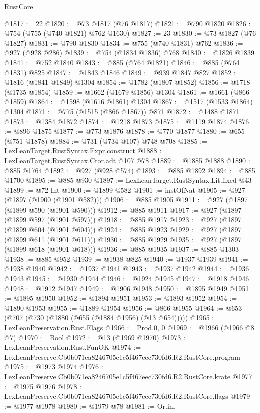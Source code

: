 \begin{lexlean}{RustCore}
\begin{coremodule}
@1817 := 22
@1820 := @73 @1817 (@76 @1817)
@1821 := @790 @1820
@1826 := @754 (@755 (@740 @1821) @762 @1630)
@1827 := 23
@1830 := @73 @1827 (@76 @1827)
@1831 := @790 @1830
@1834 := @755 (@740 @1831) @762
@1836 := @927 (@928 @286)
@1839 := @754 (@1834 @1836) @768
@1840 := @1826 @1839
@1841 := @752 @1840
@1843 := @885 (@764 @1821)
@1846 := @885 (@764 @1831) @825
@1847 := @1843 @1846
@1849 := @939 @1847 @827
@1852 := @1816 (@1841 @1849) @1304
@1854 := @1782 (@1807 @1852)
@1856 := @1718 (@1735 @1854)
@1859 := @1662 (@1679 @1856) @1304
@1861 := @1661 (@866 @1859)
@1864 := @1598 (@1616 @1861) @1304
@1867 := @1517 (@1533 @1864) @1304
@1871 := @775 (@1515 (@866 @1867)) @871
@1872 := @1488 @1871
@1873 := @1384 @1872
@1874 := @1218 @1873
@1875 := @1119 @1874
@1876 := @896 @1875
@1877 := @773 @1876
@1878 := @770 @1877
@1880 := @655 (@751 @1878)
@1884 := @731 (@734 @107) @748 @708
@1885 := LexLeanTarget.RustSyntax.Expr.construct
@1888 := LexLeanTarget.RustSyntax.Ctor.adt @107 @78
@1889 := @1885 @1888
@1890 := @885 @1764
@1892 := @927 (@928 @574)
@1893 := @885 @1892
@1894 := @885 @1700
@1895 := @885 @930
@1897 := LexLeanTarget.RustSyntax.Lit.fixed @43
@1899 := @72 Int
@1900 := @1899 @582
@1901 := instOfNat
@1905 := @927 (@1897 (@1900 (@1901 @582)))
@1906 := @885 @1905
@1911 := @927 (@1897 (@1899 @590 (@1901 @590)))
@1912 := @885 @1911
@1917 := @927 (@1897 (@1899 @597 (@1901 @597)))
@1918 := @885 @1917
@1923 := @927 (@1897 (@1899 @604 (@1901 @604)))
@1924 := @885 @1923
@1929 := @927 (@1897 (@1899 @611 (@1901 @611)))
@1930 := @885 @1929
@1935 := @927 (@1897 (@1899 @618 (@1901 @618)))
@1936 := @885 @1935
@1937 := @885 @1303
@1938 := @885 @952
@1939 := @1938 @825
@1940 := @1937 @1939
@1941 := @1938 @1940
@1942 := @1937 @1941
@1943 := @1937 @1942
@1944 := @1936 @1943
@1945 := @1930 @1944
@1946 := @1924 @1945
@1947 := @1918 @1946
@1948 := @1912 @1947
@1949 := @1906 @1948
@1950 := @1895 @1949
@1951 := @1895 @1950
@1952 := @1894 @1951
@1953 := @1893 @1952
@1954 := @1890 @1953
@1955 := @1889 @1954
@1956 := @866 @1955
@1964 := @653 (@707 (@730 (@1880 (@655 (@1884 @1956) (@13 @654)))))
@1965 := LexLeanPreservation.Rust.Flags
@1966 := Prod.{0, 0}
@1969 := @1966 (@1966 @8 @7)
@1970 := Bool
@1972 := @13 (@1969 @1970)
@1973 := LexLeanPreservation.Rust.FunOK
@1974 := LexLeanPreserve.Cb0b071ea8246705e1c5f467eec730fd6.R2.RustCore.program
@1975 := @1973 @1974
@1976 := LexLeanPreserve.Cb0b071ea8246705e1c5f467eec730fd6.R2.RustCore.krate
@1977 := @1975 @1976
@1978 := LexLeanPreserve.Cb0b071ea8246705e1c5f467eec730fd6.R2.RustCore.flags
@1979 := @1977 @1978
@1980 := @1979 @78
@1981 := Or.inl

\end{coremodule}
\end{lexlean}
